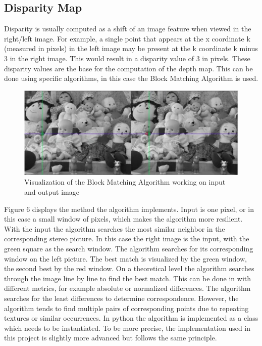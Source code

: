 \documentclass[journal,onecolumn]{IEEEtran}
\begin{document}
\subsection{Disparity Map}
\noindent
Disparity is usually computed as a shift of an image feature when viewed in the right/left image. For example, a single point that appears at the x coordinate k (measured in pixels) in the left image may be present at the k coordinate k minus 3 in the right image. This would result in a disparity value of 3 in pixels. These disparity values are the base for the computation of the depth map.
This can be done using specific algorithms, in this case the Block Matching Algorithm is used.
\begin{figure}[H]
	\centering
	\includegraphics[scale=0.5]{bma.png}
	\captionsetup{justification=centering}
	\caption{Visualization of the Block Matching Algorithm working on input and output image}
\end{figure}
\noindent
Figure 6 displays the method the algorithm implements. Input is one pixel, or in this case a small window of pixels, which makes the algorithm more resilient. With the input the algorithm searches the most similar neighbor in the corresponding stereo picture. In this case the right image is the input, with the green square as the search window. The algorithm searches for its corresponding window on the left picture. The best match is visualized by the green window, the second best by the red window.
On a theoretical level the algorithm searches through the image line by line to find the best match.
This can be done in with different metrics, for example absolute or normalized differences. The algorithm searches for the least differences to determine correspondence. However, the algorithm tends to find multiple pairs of corresponding points due to repeating textures or similar occurrences.
In python the algorithm is implemented as a class which needs to be instantiated. To be more precise, the implementation used in this project is slightly more advanced\cite{SGBM} but follows the same principle.
\end{document}
